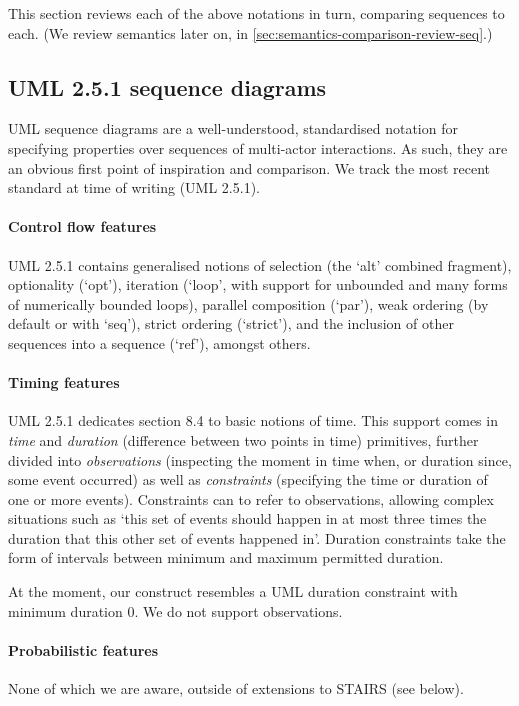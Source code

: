 
This section reviews each of the above notations in turn, comparing
\langname{} sequences to each.  (We review semantics
later on, in \cref{sec:semantics-comparison-review-seq}.)

\subsection{UML 2.5.1 sequence diagrams}

UML sequence diagrams are a well-understood, standardised notation for
specifying properties over sequences of multi-actor interactions.  As such, they
are an obvious first point of inspiration and comparison.  We track the most
recent standard at time of writing (UML 2.5.1).

\paragraph{Control flow features}
UML 2.5.1 contains generalised notions of selection (the `alt' combined fragment),
optionality (`opt'), iteration (`loop', with support for unbounded and many
forms of numerically bounded loops), parallel composition (`par'), weak ordering
(by default or with `seq'), strict ordering (`strict'), and the inclusion of
other sequences into a sequence (`ref'), amongst others.

\paragraph{Timing features}
UML 2.5.1 dedicates section 8.4 to basic notions of time.  This
support comes in \emph{time} and \emph{duration} (difference between two points
in time) primitives, further divided into \emph{observations} (inspecting the
moment in time when, or duration since, some event occurred) as well as
\emph{constraints} (specifying the time or duration of one or more events).
Constraints can to refer to observations, allowing complex situations such as
`this set of events should happen in at most three times the duration that
this other set of events happened in'.  Duration constraints take the
form of intervals between minimum and maximum permitted duration.

At the moment, our \mdeadlinestep{} construct resembles a UML duration
constraint with minimum duration \(0\).  We do not support observations.

\paragraph{Probabilistic features}
None of which we are aware, outside of extensions to STAIRS (see below).

